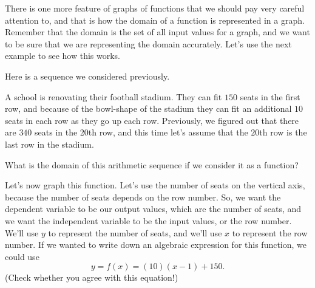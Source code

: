 \documentclass{ximera}
\begin{document}
There is one more feature of graphs of functions that we should pay very careful attention to, and that is how the domain of a function is represented in a graph. Remember that the domain is the set of all input values for a graph, and we want to be sure that we are representing the domain accurately. Let's use the next example to see how this works.
\begin{example}
Here is a sequence we considered previously. 

A school is renovating their football stadium. They can fit $150$ seats in the first row, and because of the bowl-shape of the stadium they can fit an additional $10$ seats in each row as they go up each row. Previously, we figured out that there are $340$ seats in the 20th row, and this time let's assume that the $20$th row is the last row in the stadium. 

What is the domain of this arithmetic sequence if we consider it as a function?
\begin{multipleChoice}
\end{multipleChoice}

Let's now graph this function. Let's use the number of seats on the vertical axis, because the number of seats depends on the row number. So, we want the dependent variable to be our output values, which are the number of seats, and we want the independent variable to be the input values, or the row number. We'll use $y$ to represent the number of seats, and we'll use $x$ to represent the row number. If we wanted to write down an algebraic expression for this function, we could use
\[
y = f(x) = (10)(x-1) + 150.
\]
(Check whether you agree with this equation!) 


\end{example}
\end{document}
